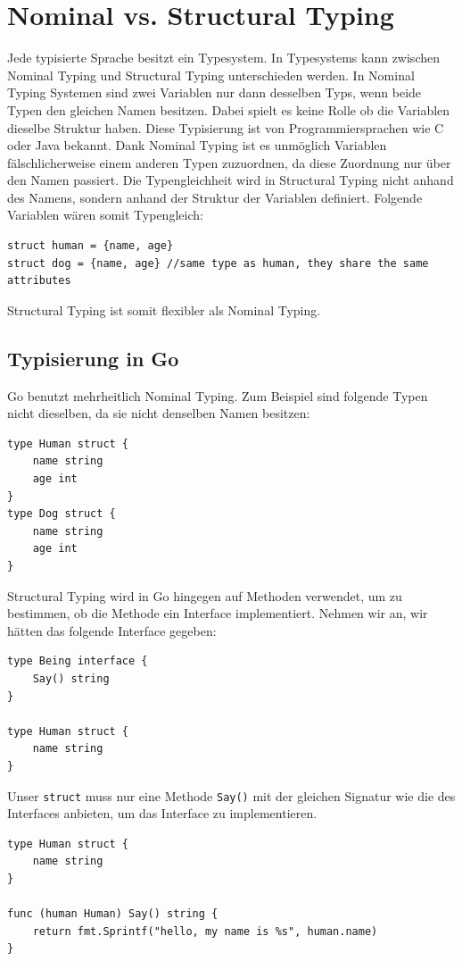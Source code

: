\documentclass[11pt]{article}
\begin{document}
\section{Nominal vs. Structural Typing}
Jede typisierte Sprache besitzt ein Typesystem. In Typesystems kann zwischen Nominal Typing und Structural Typing unterschieden werden. In Nominal Typing Systemen sind zwei Variablen nur dann desselben Typs, wenn beide Typen den gleichen Namen besitzen. Dabei spielt es keine Rolle ob die Variablen dieselbe Struktur haben. Diese Typisierung ist von Programmiersprachen wie C oder Java bekannt. Dank Nominal Typing ist es unmöglich Variablen fälschlicherweise einem anderen Typen zuzuordnen, da diese Zuordnung nur über den Namen passiert. Die Typengleichheit wird in Structural Typing nicht anhand des Namens, sondern anhand der Struktur der Variablen definiert. Folgende Variablen wären somit Typengleich:
\begin{lstlisting}[caption=Beispiel von Structural Typing (Pseudo Code)]
struct human = {name, age}
struct dog = {name, age} //same type as human, they share the same attributes
\end{lstlisting}
Structural Typing ist somit flexibler als Nominal Typing.

\subsection{Typisierung in Go}
Go benutzt mehrheitlich Nominal Typing. Zum Beispiel sind folgende Typen nicht dieselben, da sie nicht denselben Namen besitzen:
\begin{lstlisting}[caption=Nominal Typing in Go]
type Human struct {
    name string 
    age int
}
type Dog struct {
    name string
    age int
}
\end{lstlisting}
Structural Typing wird in Go hingegen auf Methoden verwendet, um zu bestimmen, ob die Methode ein Interface implementiert. Nehmen wir an, wir hätten das folgende Interface gegeben:
\begin{lstlisting}[caption=Nominal Typing in Go]
type Being interface {
	Say() string
}

type Human struct {
	name string
}
\end{lstlisting}

Unser \lstinline{struct} muss nur eine Methode \lstinline{Say()} mit der gleichen Signatur wie die des Interfaces anbieten, um das Interface zu implementieren.
\begin{lstlisting}[caption=Implementation eines Interfaces]
type Human struct {
	name string
}

func (human Human) Say() string {
	return fmt.Sprintf("hello, my name is %s", human.name)
}
\end{lstlisting}
\end{document}
